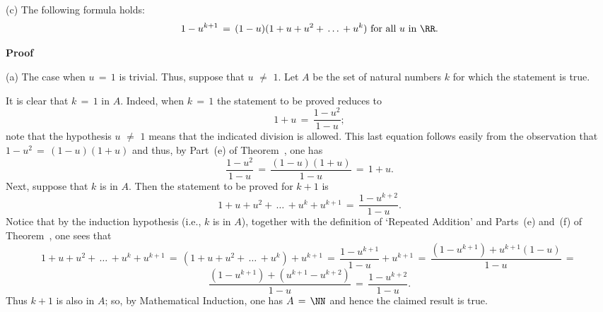 \V

        (c) The following formula holds:
        \begin{displaymath}
        1-u^{k+1} \,=\, (1-u)(1+u+u^{2}+\,{\ldots}\,+u^{k}) \mbox{ for all $u$ in ${\RR}$}.
        \end{displaymath}

\V

        {\bf Proof}

\V

        (a) The case when $u \,=\, 1$ is trivial.  Thus, suppose that $u \,\,{\neq}\,\, 1$.
    Let $A$ be the set of natural numbers $k$ for which the statement is true.

        It is clear that $k \,=\, 1$ in $A$.
    Indeed, when $k \,=\, 1$ the statement to be proved reduces to
        \begin{displaymath}
        1+u \,=\, \frac{1-u^{2}}{1-u};
        \end{displaymath}
    note that the hypothesis $u \,\,{\neq}\,\, 1$ means that the indicated division is allowed.
    This last equation follows easily from the observation that $1-u^{2} \,=\, (1-u)(1+u)$ and thus, by Part~(e) of Theorem~, one has
        \begin{displaymath}
        \frac{1-u^{2}}{1-u} \,=\, \frac{(1-u)(1+u)}{1-u} \,=\, 1+u.
        \end{displaymath}
    Next, suppose that $k$ is in $A$. Then the statement to be proved for $k+1$ is
        \begin{displaymath}
        1+u+u^{2}+\,{\ldots}\,+u^{k} + u^{k+1} \,=\, \frac{1-u^{k+2}}{1-u}.
        \end{displaymath}
    Notice that by the induction hypothesis (i.e., $k$ is in $A$), together with the definition of `Repeated Addition' and Parts~(e) and~(f) of Theorem~, one sees that
        \begin{displaymath}
        1+u+u^{2}+\,{\ldots}\,+u^{k} + u^{k+1} \,=\, (1+u+u^{2}+\,{\ldots}\,+u^{k}) + u^{k+1} \,=\, 
    \frac{1-u^{k+1}}{1-u} + u^{k+1} \,=\, \frac{(1-u^{k+1})+ u^{k+1}(1-u)}{1-u} \,=\, 
        \end{displaymath}
        \begin{displaymath}
    \frac{(1-u^{k+1})+ (u^{k+1}-u^{k+2})}{1-u} \,=\, \frac{1-u^{k+2}}{1-u}.
        \end{displaymath}
    Thus $k+1$ is also in $A$; so, by Mathematical Induction, one has $A \,=\, {\NN}$ and hence the claimed result is true.

